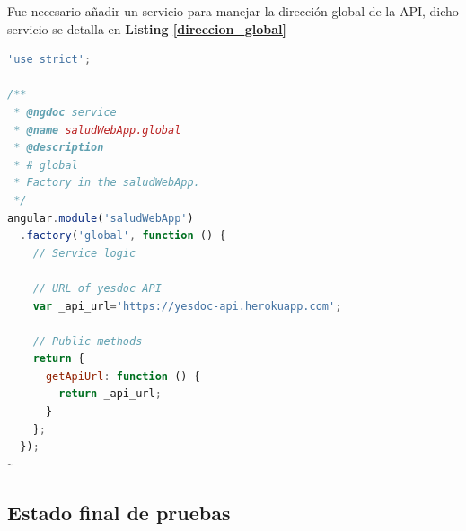 Fue necesario añadir  un servicio para manejar la dirección global de la API, dicho servicio se detalla en \textbf{Listing \ref{direccion_global}}
\begin{lstlisting}[language=JavaScript, caption= Servicio de la dirección global de la API, label=direccion_global]
'use strict';                                                                   
                                                                                
/**                                                                             
 * @ngdoc service                                                               
 * @name saludWebApp.global                                                     
 * @description                                                                 
 * # global                                                                     
 * Factory in the saludWebApp.                                                  
 */                                                                             
angular.module('saludWebApp')                                                   
  .factory('global', function () {                                              
    // Service logic                                                               
                                                                                
    // URL of yesdoc API                                                           
    var _api_url='https://yesdoc-api.herokuapp.com';                               
                                                                                   
    // Public methods                                                              
    return {                                                                       
      getApiUrl: function () {                                                     
        return _api_url;                                                           
      }                                                                            
    };                                                                             
  });                                                                              
~                                                                            
\end{lstlisting}


\clearpage


\subsection{Estado final de pruebas}

